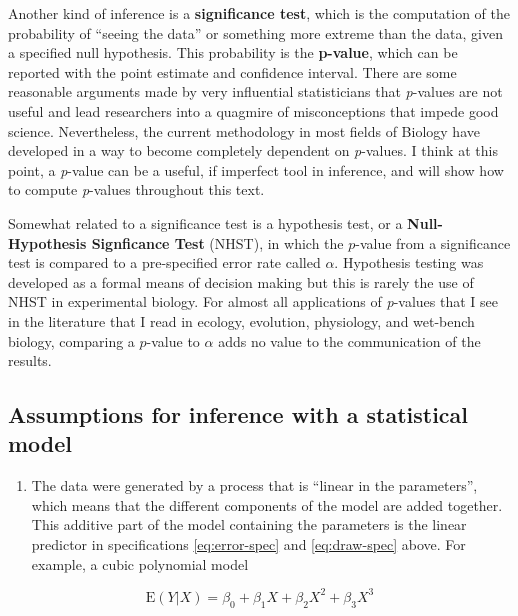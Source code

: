 \documentclass[]{book}
\providecommand{\tightlist}{%
  \setlength{\itemsep}{0pt}\setlength{\parskip}{0pt}}
\begin{document}
Another kind of inference is a \textbf{significance test}, which is the computation of the probability of ``seeing the data'' or something more extreme than the data, given a specified null hypothesis. This probability is the \textbf{p-value}, which can be reported with the point estimate and confidence interval. There are some reasonable arguments made by very influential statisticians that \emph{p}-values are not useful and lead researchers into a quagmire of misconceptions that impede good science. Nevertheless, the current methodology in most fields of Biology have developed in a way to become completely dependent on \emph{p}-values. I think at this point, a \emph{p}-value can be a useful, if imperfect tool in inference, and will show how to compute \emph{p}-values throughout this text.

Somewhat related to a significance test is a hypothesis test, or a \textbf{Null-Hypothesis Signficance Test} (NHST), in which the \(p\)-value from a significance test is compared to a pre-specified error rate called \(\alpha\). Hypothesis testing was developed as a formal means of decision making but this is rarely the use of NHST in experimental biology. For almost all applications of \emph{p}-values that I see in the literature that I read in ecology, evolution, physiology, and wet-bench biology, comparing a \(p\)-value to \(\alpha\) adds no value to the communication of the results.

\hypertarget{assumptions-for-inference-with-a-statistical-model}{%
\subsection{Assumptions for inference with a statistical model}\label{assumptions-for-inference-with-a-statistical-model}}

\begin{enumerate}
\def\labelenumi{\arabic{enumi}.}
\tightlist
\item
  The data were generated by a process that is ``linear in the parameters'', which means that the different components of the model are added together. This additive part of the model containing the parameters is the linear predictor in specifications \eqref{eq:error-spec} and \eqref{eq:draw-spec} above. For example, a cubic polynomial model
\end{enumerate}

\begin{equation}
\mathrm{E}(Y|X) = \beta_0 + \beta_1 X + \beta_2 X^2 + \beta_3 X^3
\end{equation}
\end{document}
